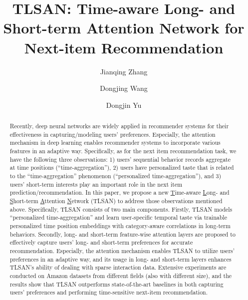 \documentclass[preprint,12pt]{elsarticle}
\newcommand{\tool}{TLSAN\xspace}
\begin{document}
\begin{sloppypar}

\begin{frontmatter}





\title{TLSAN: Time-aware Long- and Short-term Attention Network for Next-item Recommendation}

\author[a]{Jianqing Zhang}
\author[a]{Dongjing Wang}
\author[a]{Dongjin Yu}
\address[a]{School of Computer Science and Technology, Hangzhou Dianzi University, China}



\begin{abstract}
Recently, deep neural networks are widely applied in recommender systems for their effectiveness in capturing/modeling users' preferences. Especially, the attention mechanism in deep learning enables recommender systems to incorporate various features in an adaptive way. Specifically, as for the next item recommendation task, we have the following three observations: 1) users' sequential behavior records aggregate at time positions (``time-aggregation''), 2) users have personalized taste that is related to the ``time-aggregation'' phenomenon (``personalized time-aggregation''), and 3) users' short-term interests play an important role in the next item prediction/recommendation. In this paper, we propose a new \underline{T}ime-aware \underline{L}ong- and \underline{S}hort-term \underline{A}ttention \underline{N}etwork (\tool) to address those observations mentioned above. Specifically, \tool consists of two main components. Firstly, \tool models ``personalized time-aggregation'' and learn user-specific temporal taste via trainable personalized time position embeddings with category-aware correlations in long-term behaviors. Secondly, long- and short-term feature-wise attention layers are proposed to effectively capture users' long- and short-term preferences for accurate recommendation. Especially, the attention mechanism enables \tool to utilize users' preferences in an adaptive way, and its usage in long- and short-term layers enhances \tool's ability of dealing with sparse interaction data. Extensive experiments are conducted on Amazon datasets from different fields (also with different size), and the results show that \tool outperforms state-of-the-art baselines in both capturing users' preferences and performing time-sensitive next-item recommendation.
\end{abstract}




\end{frontmatter}
\end{sloppypar}
\end{document}
